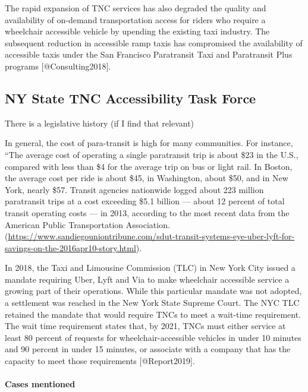 \documentclass[]{article}
\let\oldparagraph\paragraph
\renewcommand{\paragraph}[1]{\oldparagraph{#1}\mbox{}}
\begin{document}
The rapid expansion of TNC services has also degraded the quality and
availability of on-demand transportation access for riders who require a
wheelchair accessible vehicle by upending the existing taxi industry.
The subsequent reduction in accessible ramp taxis has compromised the
availability of accessible taxis under the San Francisco Paratransit
Taxi and Paratransit Plus programs {[}@Consulting2018{]}.

\hypertarget{ny-state-tnc-accessibility-task-force}{%
\subsection{NY State TNC Accessibility Task
Force}\label{ny-state-tnc-accessibility-task-force}}

There is a legislative history (if I find that relevant)

In general, the cost of para-transit is high for many communities. For
instance, ``The average cost of operating a single paratransit trip is
about \$23 in the U.S., compared with less than \$4 for the average trip
on bus or light rail. In Boston, the average cost per ride is about
\$45, in Washington, about \$50, and in New York, nearly \$57. Transit
agencies nationwide logged about 223 million paratransit trips at a cost
exceeding \$5.1 billion --- about 12 percent of total transit operating
costs --- in 2013, according to the most recent data from the American
Public Transportation Association.
(\url{https://www.sandiegouniontribune.com/sdut-transit-systems-eye-uber-lyft-for-savings-on-the-2016apr10-story.html}).

In 2018, the Taxi and Limousine Commission (TLC) in New York City issued
a mandate requiring Uber, Lyft and Via to make wheelchair accessible
service a growing part of their operations. While this particular
mandate was not adopted, a settlement was reached in the New York State
Supreme Court. The NYC TLC retained the mandate that would require TNCs
to meet a wait-time requirement. The wait time requirement states that,
by 2021, TNCs must either service at least 80 percent of requests for
wheelchair-accessible vehicles in under 10 minutes and 90 percent in
under 15 minutes, or associate with a company that has the capacity to
meet those requirements {[}@Report2019{]}.

\hypertarget{cases-mentioned}{%
\paragraph{Cases mentioned}\label{cases-mentioned}}
\end{document}
